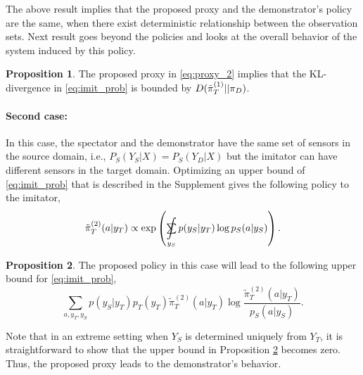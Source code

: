 \documentclass[letterpaper]{article} %
\theoremstyle{definition}%
\theoremstyle{definition}
\newtheorem{proposition}{Proposition}
\newcommand{\Obs}{Y}
\newcommand{\obs}{y}
\newcommand{\todo}[1]{\textcolor{red}{#1}}
\DeclareMathOperator*{\SumInt}{%
	\mathchoice%
	{\ooalign{$\sum$\cr\hidewidth$\displaystyle\int$\hidewidth\cr}}
	{\ooalign{\raisebox{.14\height}{\scalebox{.7}{$\textstyle\sum$}}\cr\hidewidth$\textstyle\int$\hidewidth\cr}}
	{\ooalign{\raisebox{.2\height}{\scalebox{.6}{$\scriptstyle\sum$}}\cr$\scriptstyle\int$\cr}}
	{\ooalign{\raisebox{.2\height}{\scalebox{.6}{$\scriptstyle\sum$}}\cr$\scriptstyle\int$\cr}}
}
\begin{document}
The above result implies that the proposed proxy and the demonstrator's policy are the same, when there exist deterministic relationship between the observation sets.
Next result goes beyond the policies and looks at the overall behavior of the system induced by this policy.


\begin{proposition}\label{pro:imi5}
The proposed proxy in \eqref{eq:proxy_2} implies that the KL-divergence in \eqref{eq:imit_prob} is bounded by
$\begin{small}
D(\tilde{\pi}^{(1)}_T||\pi_D)
\end{small}$.
\end{proposition}

\paragraph{Second case:}
In this case, the spectator and the demonstrator have the same set of sensors in the source domain, i.e., $P_S(\Obs_S|X)=P_S(\Obs_D|X)$ but the imitator can have different sensors in the target domain.
Optimizing an upper bound of \eqref{eq:imit_prob} that is described in the Supplement gives the following policy to the imitator,
$$
\tilde{\pi}^{(2)}_T(a | \obs_T) \propto \exp\left(\SumInt_{\obs_S}p(\obs_S | \obs_T)\log p_S(a|\obs_S)\right).
$$

\begin{proposition}\label{pro:imi6}
The proposed policy in this case will lead to the following upper bound for  \eqref{eq:imit_prob},
$$
\sum_{a, \obs_T, \obs_S} p(\obs_S| \obs_T) p_T(\obs_T)\tilde{\pi}^{(2)}_T(a|\obs_T)\log \frac{\tilde{\pi}^{(2)}_T(a|\obs_T)}{p_S(a|\obs_S)}.
$$
\end{proposition}

Note that in an extreme setting when $\Obs_S$ is determined uniquely from $\Obs_T$, it is straightforward to show that the upper bound in Proposition \ref{pro:imi6} becomes zero. Thus, the proposed proxy leads to the demonstrator's behavior.

\end{document}
